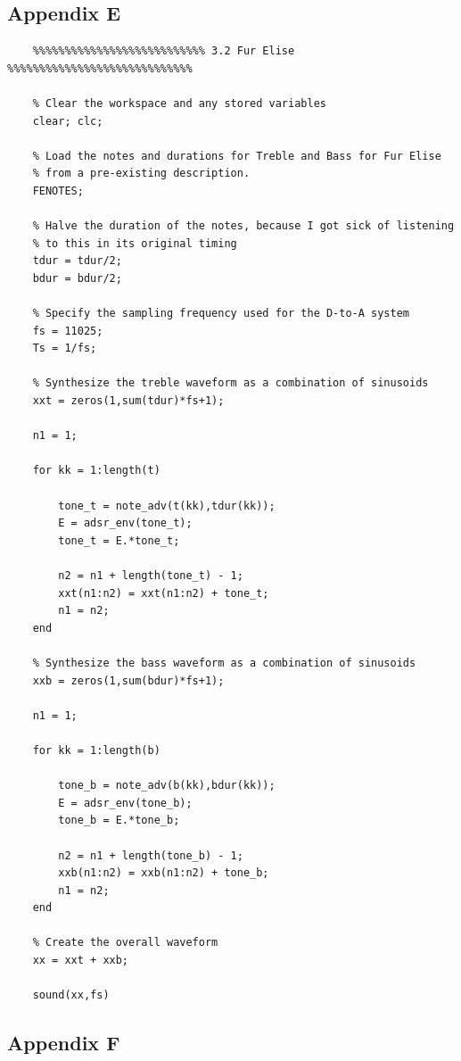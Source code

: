 \documentclass{article}
\begin{document}
\subsection{Appendix E}

\begin{lstlisting}
	%%%%%%%%%%%%%%%%%%%%%%%%%%% 3.2 Fur Elise %%%%%%%%%%%%%%%%%%%%%%%%%%%%%
	
	% Clear the workspace and any stored variables
	clear; clc;
	
	% Load the notes and durations for Treble and Bass for Fur Elise
	% from a pre-existing description.
	FENOTES;
	
	% Halve the duration of the notes, because I got sick of listening
	% to this in its original timing
	tdur = tdur/2;
	bdur = bdur/2;
	
	% Specify the sampling frequency used for the D-to-A system
	fs = 11025;
	Ts = 1/fs;
	
	% Synthesize the treble waveform as a combination of sinusoids
	xxt = zeros(1,sum(tdur)*fs+1);
	
	n1 = 1;
	
	for kk = 1:length(t)
	    
	    tone_t = note_adv(t(kk),tdur(kk));
	    E = adsr_env(tone_t);
	    tone_t = E.*tone_t;
	    
	    n2 = n1 + length(tone_t) - 1;
	    xxt(n1:n2) = xxt(n1:n2) + tone_t;
	    n1 = n2;
	end
	
	% Synthesize the bass waveform as a combination of sinusoids
	xxb = zeros(1,sum(bdur)*fs+1);
	
	n1 = 1;
	
	for kk = 1:length(b)
	    
	    tone_b = note_adv(b(kk),bdur(kk));
	    E = adsr_env(tone_b);
	    tone_b = E.*tone_b;
	    
	    n2 = n1 + length(tone_b) - 1;
	    xxb(n1:n2) = xxb(n1:n2) + tone_b;
	    n1 = n2;
	end
	
	% Create the overall waveform
	xx = xxt + xxb;
	
	sound(xx,fs)
\end{lstlisting}

\newpage

\subsection{Appendix F}
\end{document}
